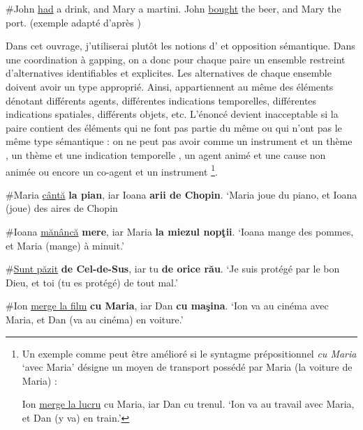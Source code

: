 \ea \label{ch2:ex149}
\ea \#John \uline{had} a drink, and Mary a martini. \label{ch2:ex149a}
\ex John \uline{bought} the beer, and Mary the port. (exemple adapté d'après \citealt{Umbach2005}) \label{ch2:ex149b}
\z
\z

Dans cet ouvrage, j’utiliserai plutôt les notions d’ et opposition sémantique. Dans une coordination à gapping, on a donc pour chaque paire un ensemble restreint d’alternatives identifiables et explicites. Les alternatives de chaque ensemble doivent avoir un type approprié. Ainsi, appartiennent au même  des éléments dénotant différents agents, différentes indications temporelles, différentes indications spatiales, différents objets, etc. L’énoncé devient inacceptable si la paire contient des éléments qui ne font pas partie du même  ou qui n’ont pas le même type sémantique  : on ne peut pas avoir comme  un instrument et un thème , un thème et une indication temporelle , un agent animé et une cause non animée  ou encore un co-agent et un instrument \footnote{
Un exemple comme  peut être amélioré si le syntagme prépositionnel \textit{cu Maria} ‘avec Maria’ désigne un moyen de transport possédé par Maria (la voiture de Maria) : 

\ea 
Ion \uline{merge la lucru} cu Maria, iar Dan cu trenul.
\glt ‘Ion va au travail avec Maria, et Dan (y va) en train.’
\z
}.


\ea \label{ch2:ex150}
\ea \#Maria \uline{cântă} \textbf{la pian}, iar Ioana \textbf{arii de Chopin}. \label{ch2:ex150a}
\glt ‘Maria joue du piano, et Ioana (joue) des aires de Chopin

\ex \#Ioana \uline{mănâncă} \textbf{mere}, iar Maria \textbf{la miezul nopţii}. \label{ch2:ex150b} 
\glt ‘Ioana mange des pommes, et Maria (mange) à minuit.’

\ex \#\uline{Sunt păzit} \textbf{de Cel-de-Sus}, iar tu \textbf{de orice rău}. \label{ch2:ex150c} 
\glt ‘Je suis protégé par le bon Dieu, et toi (tu es protégé) de tout mal.’

\ex \#Ion \uline{merge la film} \textbf{cu Maria}, iar Dan \textbf{cu maşina}. \label{ch2:ex150d} 
\glt ‘Ion va au cinéma avec Maria, et Dan (va au cinéma) en voiture.’
\z
\z

